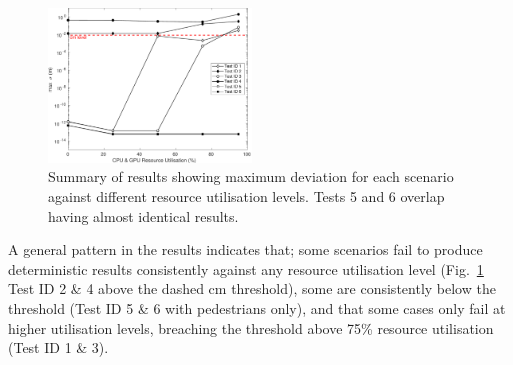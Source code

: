 \documentclass[letterpaper, 10 pt, journal, twoside]{IEEEtran}
\begin{document}
\begin{figure}[!t]
    \centering
    \includegraphics[width=0.48\textwidth]{Other/Figures/ExperimentsStressSummaryV4.pdf}
    \caption{Summary of results showing maximum deviation for each scenario against different resource utilisation levels. Tests 5 and 6 overlap having almost identical results.}
    \label{ExperimentsStressSummary}
\end{figure}

A general pattern in the results indicates that; some scenarios fail to produce deterministic results consistently against any resource utilisation level (Fig.~\ref{ExperimentsStressSummary} Test ID 2 \& 4 above the dashed cm threshold), some are consistently below the threshold (Test ID 5 \& 6 with pedestrians only), and that some cases only fail at higher utilisation levels, breaching the threshold above 75\% resource utilisation (Test ID 1 \& 3).

\end{document}
